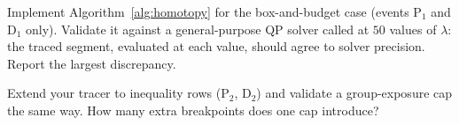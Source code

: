 \begin{exercises}
\begin{exercise}[Implementation]
Implement Algorithm~\ref{alg:homotopy} for the box-and-budget case (events
$\mathrm{P}_1$ and $\mathrm{D}_1$ only). Validate it against a general-purpose QP
solver called at $50$ values of $\lambda$: the traced segment, evaluated at each
value, should agree to solver precision. Report the largest discrepancy.
\end{exercise}

\begin{exercise}[Implementation]
Extend your tracer to inequality rows ($\mathrm{P}_2$, $\mathrm{D}_2$) and validate a
group-exposure cap the same way. How many extra breakpoints does one cap introduce?
\end{exercise}

\end{exercises}
